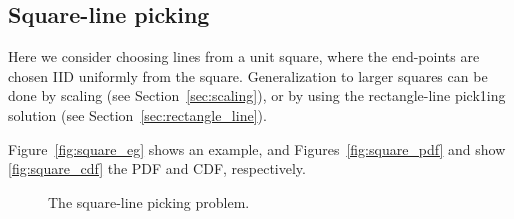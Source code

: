 \subsection{Square-line picking}
\label{sec:square_line}

Here we consider choosing lines from a unit square, where the
end-points are chosen IID uniformly from the square. Generalization to
larger squares can be done by scaling (see Section~\ref{sec:scaling}),
or by using the rectangle-line pick1ing solution (see
Section~\ref{sec:rectangle_line}).

Figure~\ref{fig:square_eg} shows an example, and
Figures~\ref{fig:square_pdf} and show \ref{fig:square_cdf} the PDF and
CDF, respectively. 

\begin{figure}[tbp]
  \begin{center}
    \hspace{3mm}
    \caption{The square-line picking problem.}
  \end{center} 
\vspace{-4mm}
\end{figure}

